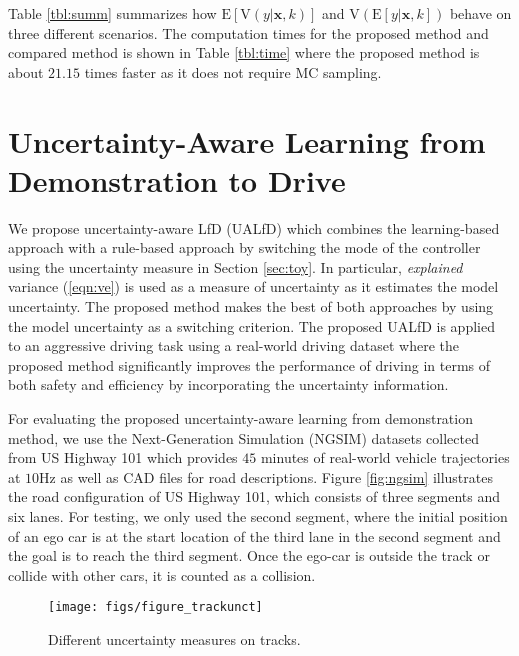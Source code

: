 \documentclass[letterpaper, 10 pt, conference]{ieeeconf}  %
\def\Bx{\mathbf{x}} \def\By{\mathbf{y}} \def\Bp{\mathbf{p}}
\begin{document}
Table \ref{tbl:summ} summarizes how 
$\mathrm{E}[\mathrm{V}(y|\Bx, k)]$
and 
$\mathrm{V}(\mathrm{E}[y|\Bx, k])$
behave on three different scenarios. 
The computation times for the proposed method
and compared method \cite{Kendall_17} is shown in 
Table \ref{tbl:time} where the proposed method
is about $21.15$ times faster as it does not 
require MC sampling. 




\section{Uncertainty-Aware Learning from Demonstration to Drive} \label{sec:lfd}



We propose uncertainty-aware LfD (UALfD) which
combines the learning-based approach with
a rule-based approach by switching the mode of the controller 
using the uncertainty measure in Section \ref{sec:toy}. 
In particular, 
\textit{explained} variance (\ref{eqn:ve}) is used as a measure
of uncertainty 
as it estimates the model uncertainty.
The proposed method makes the best of both approaches
by using the model uncertainty as a switching criterion.
The proposed UALfD is applied to an aggressive driving task
using a real-world driving dataset \cite{Colyar_07}
where the proposed method significantly improves the 
performance of driving in terms of both safety and efficiency
by incorporating the uncertainty information. 

For evaluating the proposed uncertainty-aware learning from demonstration
method, we use the Next-Generation Simulation (NGSIM)
datasets collected from
US Highway 101 \cite{Colyar_07} which provides
$45$ minutes of real-world vehicle trajectories at $10$Hz
as well as CAD files for road descriptions. 
Figure \ref{fig:ngsim} illustrates the road configuration of 
US Highway 101, which consists of three segments
and six lanes. 
For testing, we only used the second segment, where the initial position 
of an ego car is at the start location of the third lane in the second segment
and the goal is to reach the third segment. 
Once the ego-car is outside the track or collide with other cars, 
it is counted as a collision. 


\begin{figure}[!t] \centering
	\texttt{[image: figs/figure\_trackunct]}
	\label{fig:trackres_a}
	\caption{
		Different uncertainty measures on
		tracks. 
		}
	\label{fig:trackres}
\end{figure}
\end{document}
